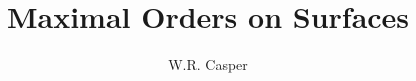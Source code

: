 \documentclass[draft]{article}
\title{Maximal Orders on Surfaces}
\author{W.R. Casper}
\newcommand{\ntt}{\normalfont\ttfamily}
\theoremstyle{definition}
\theoremstyle{remark}
\begin{document}
\maketitle
\renewcommand{\sectionmark}[1]{}










\newpage
\end{document}
